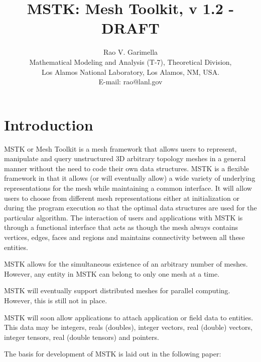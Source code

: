 \documentclass[12pt]{article}
\begin{document}
\title{MSTK: Mesh Toolkit, v 1.2 - DRAFT} 


\author{Rao V. Garimella \\
  Mathematical Modeling and Analysis (T-7), Theoretical Division, \\
  Los Alamos National Laboratory, Los Alamos, NM, USA. \\ E-mail:
  rao@lanl.gov}

\maketitle

\thispagestyle{empty}
\setlength{\parindent}{0.0in}
\setlength{\parskip}{0.5em}

\newpage
\section{Introduction}

MSTK or Mesh Toolkit is a mesh framework that allows users to
represent, manipulate and query unstructured 3D arbitrary topology
meshes in a general manner without the need to code their own data
structures. MSTK is a flexible framework in that it allows (or will
eventually allow) a wide variety of underlying representations for the
mesh while maintaining a common interface. It will allow users to
choose from different mesh representations either at initialization or
during the program execution so that the optimal data structures are
used for the particular algorithm. The interaction of users and
applications with MSTK is through a functional interface that acts as
though the mesh always contains vertices, edges, faces and regions and
maintains connectivity between all these entities.

\par MSTK allows for the simultaneous existence of an arbitrary number of
meshes. However, any entity in MSTK can belong to only one mesh at a
time.

\par MSTK will eventually support distributed meshes for parallel
computing. However, this is still not in place.

\par MSTK will soon allow applications to attach application or field data
to entities. This data may be integers, reals (doubles), integer
vectors, real (double) vectors, integer tensors, real (double tensors)
and pointers. 

\par The basis for development of MSTK is laid out in the following paper:
\end{document}
